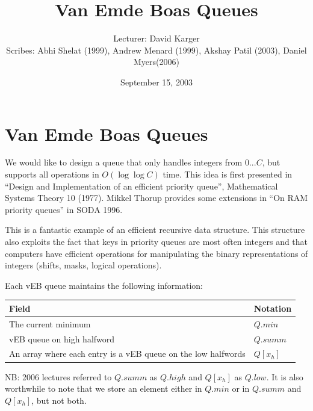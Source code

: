 \documentclass{article}[10pt]
\title{Van Emde Boas Queues}
\date{September 15, 2003}
\author{Lecturer: David Karger\\ Scribes: Abhi Shelat (1999), Andrew  Menard (1999), Akshay Patil (2003), Daniel Myers(2006)}
\begin{document}
%
%
%
%

%


\section{Van Emde Boas Queues}
We would like to design a queue that only handles integers from
$0...C$, but supports all operations in $O(\log \log C)$ time.
This idea is first presented in ``Design and Implementation of an efficient
priority queue'', Mathematical Systems Theory 10 (1977).  Mikkel Thorup
provides some extensions in ``On RAM priority queues'' in SODA 1996.

This is a fantastic example of an efficient recursive data structure.
This structure also exploits the fact that keys in priority queues are 
most often integers and that computers have efficient operations for
manipulating the binary representations of integers (shifts, masks, logical
operations).  

Each vEB queue maintains the following information:

\begin{center}
\begin{tabular}{ll} 
Field & Notation \\ \hline
The current minimum & $Q.min$ \\ 
vEB queue on high halfword & $Q.summ$ \\
An array where each entry is a vEB queue on the low halfwords & $Q[x_h]$ \\ 
\end{tabular}
\end{center}
NB: 2006 lectures referred to $Q.summ$ as $Q.high$ and $Q[x_h]$ as
$Q.low$. It is also worthwhile to note that we 
store an element either in $Q.min$ or in $Q.summ$ and $Q[x_h]$, but 
not both.
\end{document}
